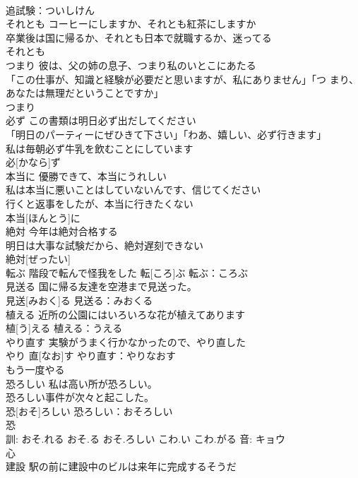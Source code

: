 \documentclass[8pt]{extreport}
\begin{document}
\begin{CJK}{UTF8}{min}
\\	追試験：ついしけん
\\	それとも	コーヒーにしますか、それとも紅茶にしますか 
\\	卒業後は国に帰るか、それとも日本で就職するか、迷ってる 
\\	それとも			
\\	つまり	彼は、父の姉の息子、つまり私のいとこにあたる 
\\	「この仕事が、知識と経験が必要だと思いますが、私にありません」「つ まり、あなたは無理だということですか」 
\\	つまり			
\\	必ず	この書類は明日必ず出だしてください 
\\	「明日のパーティーにぜひきて下さい」「わあ、嬉しい、必ず行きます」 
\\	私は毎朝必ず牛乳を飲むことにしています 
\\	必[かなら]ず			
\\	本当に	優勝できて、本当にうれしい 
\\	私は本当に悪いことはしていないんです、信じてください 
\\	行くと返事をしたが、本当に行きたくない 
\\	本当[ほんとう]に						
\\	絶対	今年は絶対合格する 
\\	明日は大事な試験だから、絶対遅刻できない 
\\	絶対[ぜったい]						
\\	転ぶ	階段で転んで怪我をした	転[ころ]ぶ			転ぶ：ころぶ
\\	見送る	国に帰る友達を空港まで見送った。 
\\	見送[みおく]る			見送る：みおくる
\\	植える	近所の公園にはいろいろな花が植えてあります 
\\	植[う]える			植える：うえる
\\	やり直す	実験がうまく行かなかったので、やり直した 
\\	やり 直[なお]す			やり直す：やりなおす
\\	もう一度やる			
\\	恐ろしい	私は高い所が恐ろしい。 
\\	恐ろしい事件が次々と起こした。 
\\	恐[おそ]ろしい			恐ろしい：おそろしい
\\	恐 
\\	訓: おそ.れる おそ.る おそ.ろしい こわ.い こわ.がる 音: キョウ 
\\	心 
\\	建設	駅の前に建設中のビルは来年に完成するそうだ 

\end{CJK}
\end{document}
